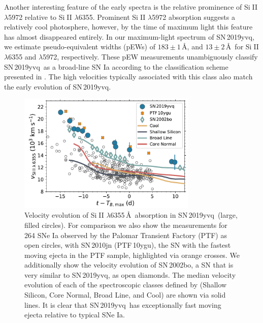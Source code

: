 \documentclass[twocolumn]{aastex63}
\def\ion#1#2{#1$\;${\footnotesize\rm{#2}}\relax}
\newcommand{\sn}{SN\,2019yvq}
\begin{document}
Another interesting feature of the early spectra is the relative prominence of
\ion{Si}{II} $\lambda$5972 relative to \ion{Si}{II} $\lambda$6355. Prominent
\ion{Si}{II} $\lambda$5972 absorption suggests a relatively cool photosphere,
however, by the time of maximum light this feature has almost disappeared
entirely. In our maximum-light spectrum of \sn, we estimate pseudo-equivalent
widths (pEWs) of $183\pm1$\,\AA, and $13\pm2$\,\AA\ for \ion{Si}{II}
$\lambda$6355 and $\lambda$5972, respectively. These pEW measurements
unambiguously classify \sn\ as a broad-line SN Ia according to the
classification scheme presented in \citet{Branch06}. The high velocities
typically associated with this class also match the early evolution of \sn.

\begin{figure}
    \centering
    \includegraphics[width=3.35in]{./figures/vel_evolution.pdf}
    \caption{Velocity evolution of \ion{Si}{II} $\lambda$6355\,\AA\ absorption
    in \sn\ (large, filled circles). For comparison we also show the
    measurements for 264 SNe Ia observed by the Palomar Transient Factory
    (PTF) as open circles, with SN\,2010jn (PTF\,10ygu), the SN with the
    fastest moving ejecta in the PTF sample, highlighted via orange crosses.
    We additionally show the velocity evolution of SN\,2002bo, a SN that is
    very similar to \sn, as open diamonds. The median velocity evolution of
    each of the spectroscopic classes defined by \citet{Branch06} (Shallow
    Silicon, Core Normal, Broad Line, and Cool) are shown via solid lines. It
    is clear that \sn\ has exceptionally fast moving ejecta relative to
    typical SNe Ia.}
    \label{fig:vel_evo}
\end{figure}
\end{document}
